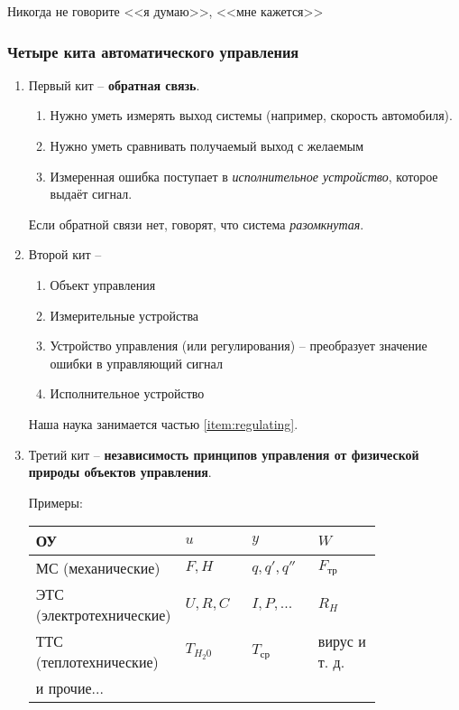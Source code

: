 \documentclass[main.tex]{subfiles}
\begin{document}
	Никогда не говорите <<я думаю>>, <<мне кажется>>	

\subsubsection{Четыре кита автоматического управления}

\begin{enumerate}
	\item Первый кит -- \textbf{обратная связь}.
	\begin{enumerate}[noitemsep]
		\item Нужно уметь измерять выход системы (например, скорость автомобиля).
		\item Нужно уметь сравнивать получаемый выход с желаемым
		\item Измеренная ошибка поступает в \emph{исполнительное устройство}, которое выдаёт сигнал.
	\end{enumerate}
	Если обратной связи нет, говорят, что система \emph{разомкнутая}.
	\item Второй кит -- %
	\begin{enumerate}[noitemsep]
		\item Объект управления
		\item Измерительные устройства
		\item Устройство управления (или регулирования) -- преобразует значение ошибки в управляющий сигнал \label{item:regulating}
		\item  Исполнительное устройство
	\end{enumerate}
	
	Наша наука занимается частью \ref{item:regulating}.
	\item Третий кит -- \textbf{независимость принципов управления от физической природы объектов управления}.
	
	Примеры:
	
	\begin{tabular}{m{0.2\linewidth} | m{0.2\linewidth} | m{0.2\linewidth} | m{0.2\linewidth}}
		\hline \hline
		ОУ & $ u $ & $ y $ & $ W $ \\
		\hline
		МС (механические) & $ F, H $ & $ q, q', q'' $ & $ F_{\text{тр}} $ \\
		ЭТС (электротехнические) & $ U, R, C $ & $ I, P, ... $ & $ R_H $ \\
		ТТС (теплотехнические) & $ T_{H_2 0} $ & $ T_{\text{ср}} $ & вирус и т. д. \\
		и прочие... & & & \\
		\hline
	\end{tabular}
	

\end{enumerate}
\end{document}
